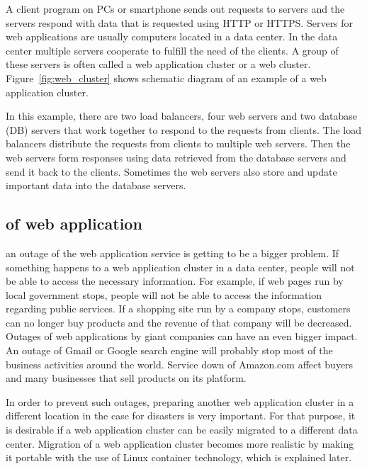 A client program on PCs or smartphone sends out requests to servers\added{,} and the servers respond with data that is requested using HTTP or HTTPS. 
Servers for web applications are usually computers located in a data center.
In the data center multiple servers cooperate to fulfill the need of the clients.
A group of these servers is often called a web application cluster or a web cluster.
Figure~\ref{fig:web_cluster} shows schematic diagram of an example of a web application cluster.

In this example, there are two load balancers, four web servers and two database (DB) servers that work together to respond to the requests from clients.
The load balancers distribute the requests from clients to multiple web servers.
Then the web servers form responses using data retrieved from the database servers and send it back to the clients.
Sometimes the web servers also store and update important data into the database servers.

\subsection{ of web application}


  an outage of the web application service is getting to be a bigger problem.
If something happens to a web application cluster in a data center, people will not be able to access the necessary information.
%
For example, if web pages run by local government stops, people will not be able to access the information regarding public services.
If a shopping site run by a company stops, customers can no longer buy products and the revenue of that company will be decreased.
Outages of web applications by giant companies can have an even bigger impact.
An outage of Gmail or Google search engine will probably stop most of the business activities around the world.
Service down of Amazon.com affect buyers and many businesses that sell products on its platform.

In order to prevent such outages, preparing another web application cluster in a different location in the case for disasters is very important.
For that purpose, it is desirable if a web application cluster can be easily migrated to a different data center.
Migration of a web application cluster becomes more realistic by making it portable with the use of Linux container technology, which is explained later.

